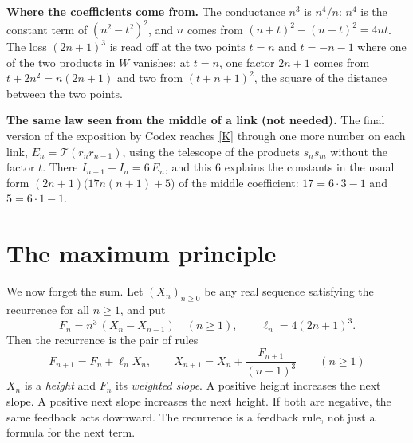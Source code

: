 \documentclass[11pt]{article}
\newcommand{\T}{\mathcal T}
\newcommand{\q}[1]{\medskip\noindent\textbf{#1}}
\begin{document}
\q{Where the coefficients come from.} The conductance $n^3$ is $n^4/n$: $n^4$ is the constant term
of $(n^2-t^2)^2$, and $n$ comes from $(n+t)^2-(n-t)^2=4nt$. The loss $(2n+1)^3$ is read off at the two
points $t=n$ and $t=-n-1$ where one of the two products in $W$ vanishes: at $t=n$, one factor $2n+1$
comes from $t+2n^2=n(2n+1)$ and two from $(t+n+1)^2$, the square of the distance between the two
points.

\q{The same law seen from the middle of a link (not needed).} The final version of the exposition
by Codex reaches \eqref{K} through one more number on each link, $E_n=\T(r_nr_{n-1})$, using the
telescope of the products $s_ns_m$ without the factor $t$. There $I_{n-1}+I_n=6\,E_n$, and this $6$
explains the constants in the usual form $(2n+1)\bigl(17n(n+1)+5\bigr)$ of the middle coefficient:
$17=6\cdot3-1$ and $5=6\cdot1-1$.

\section{The maximum principle}

We now forget the sum. Let $(X_n)_{n\ge0}$ be any real sequence satisfying the recurrence for all
$n\ge1$, and put
\[
F_n=n^3\,(X_n-X_{n-1})\quad(n\ge1),\qquad \ell_n=4(2n+1)^3 .
\]
Then the recurrence is the pair of rules
\begin{equation}\label{rules}
\boxed{\;F_{n+1}=F_n+\ell_nX_n,\qquad X_{n+1}=X_n+\frac{F_{n+1}}{(n+1)^3}\qquad(n\ge1)\;}
\end{equation}
$X_n$ is a \emph{height} and $F_n$ its \emph{weighted slope}. A positive height increases the next
slope. A positive next slope increases the next height. If both are negative, the same feedback
acts downward. The recurrence is a feedback rule, not just a formula for the next term.
\end{document}
